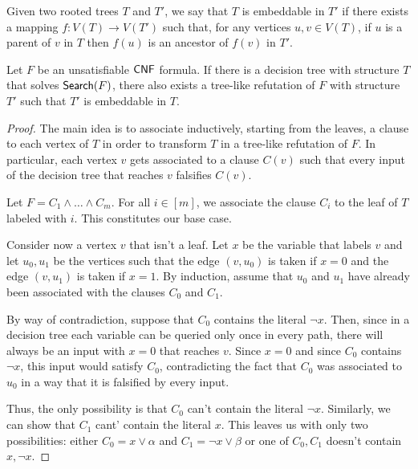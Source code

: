 \begin{definition}
Given two rooted trees $T$ and $T'$, we say that $T$ is embeddable in $T'$ if there exists a mapping $f : V(T) \to V(T')$ such that, for any vertices $u,v \in V(T)$, if $u$ is a parent of $v$ in $T$ then $f(u)$ is an ancestor of $f(v)$ in $T'$.
\end{definition}

\begin{lemma} \label{lem:dt_treeres}
    \cite{treelike_res_size,search_problems_dt_model}
    Let $F$ be an unsatisfiable $\mathsf{CNF}$ formula. If there is a decision tree with structure $T$ that solves $\mathsf{Search}(F)$, there also exists a tree-like refutation of $F$ with structure $T'$ such that $T'$ is embeddable in $T$.
\end{lemma}

\begin{proof}

    The main idea is to associate inductively, starting from the leaves, a clause to each vertex of $T$ in order to transform $T$ in a tree-like refutation of $F$. In particular, each vertex $v$ gets associated to a clause $C(v)$ such that every input of the decision tree that reaches $v$ falsifies $C(v)$.

    Let $F = C_1 \land \ldots \land C_m$. For all $i \in [m]$, we associate the clause $C_i$ to the leaf of $T$ labeled with $i$. This constitutes our base case.

    Consider now a vertex $v$ that isn't a leaf. Let $x$ be the variable that labels $v$ and let $u_0, u_1$ be the vertices such that the edge $(v, u_0)$ is taken if $x = 0$ and the edge $(v, u_1)$ is taken if $x = 1$.  By induction, assume that $u_0$ and $u_1$ have already been associated with the clauses $C_0$ and $C_1$.

    By way of contradiction, suppose that $C_0$ contains the literal $\lnot{x}$. Then, since in a decision tree each variable can be queried only once in every path, there will always be an input with $x = 0$ that reaches $v$. Since $x = 0$ and since $C_0$ contains $\lnot{x}$, this input would satisfy $C_0$, contradicting the fact that $C_0$ was associated to $u_0$ in a way that it is falsified by every input.

    Thus, the only possibility is that $C_0$ can't contain the literal $\lnot{x}$. Similarly, we can show that $C_1$ cant' contain the literal $x$. This leaves us with only two possibilities: either $C_0 = x \lor \alpha$ and $C_1 = \lnot{x} \lor \beta$ or one of $C_0, C_1$ doesn't contain $x, \lnot{x}$.


\end{proof}
